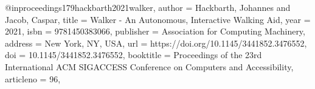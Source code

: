 @inproceedings{179hackbarth2021walker,
author = {Hackbarth, Johannes and Jacob, Caspar},
title = {Walker - An Autonomous, Interactive Walking Aid},
year = {2021},
isbn = {9781450383066},
publisher = {Association for Computing Machinery},
address = {New York, NY, USA},
url = {https://doi.org/10.1145/3441852.3476552},
doi = {10.1145/3441852.3476552},
booktitle = {Proceedings of the 23rd International ACM SIGACCESS Conference on Computers and Accessibility},
articleno = {96},
}